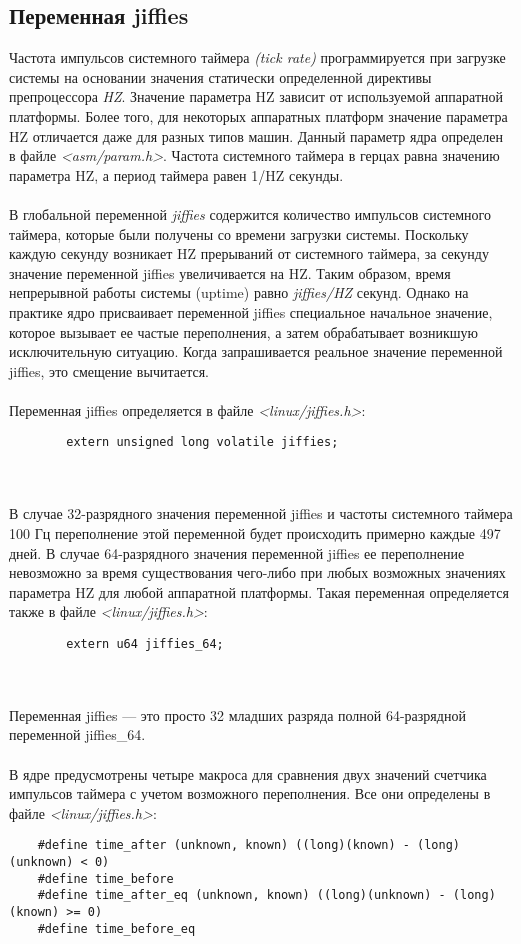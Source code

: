     \subsection{Переменная jiffies}
    Частота импульсов системного таймера \textit{(tick rate)} программируется при загрузке системы на основании значения статически определенной директивы препроцессора \textit{HZ}. Значение параметра HZ зависит от используемой аппаратной платформы. Более того, для некоторых аппаратных платформ значение параметра HZ отличается даже для разных типов машин. Данный параметр ядра определен в файле \textit{<asm/param.h>}. Частота системного таймера в герцах равна значению параметра HZ, а период таймера равен 1/HZ секунды.
    \\\\
    В глобальной переменной \textit{jiffies} содержится количество импульсов системного таймера, которые были получены со времени загрузки системы. Поскольку каждую секунду возникает HZ прерываний от системного таймера, за секунду значение переменной jiffies увеличивается на HZ. Таким образом, время непрерывной работы системы (uptime) равно \textit{jiffies/HZ} секунд. Однако на практике ядро присваивает переменной jiffies специальное начальное значение, которое вызывает ее частые переполнения, а затем обрабатывает возникшую исключительную ситуацию. Когда запрашивается реальное значение переменной jiffies, это смещение вычитается.
    \\\\
    Переменная jiffies определяется в файле \textit{<linux/jiffies.h>}:
    \begin{lstlisting}
        extern unsigned long volatile jiffies;
    \end{lstlisting}

    \\\\
    В случае 32-разрядного значения переменной jiffies и частоты системного таймера 100 Гц переполнение этой переменной будет происходить примерно каждые 497 дней. В случае 64-разрядного значения переменной jiffies ее переполнение невозможно за время существования чего-либо при любых возможных значениях параметра HZ для любой аппаратной платформы. Такая переменная определяется также в файле \textit{<linux/jiffies.h>}:
    \begin{lstlisting}
        extern u64 jiffies_64;
    \end{lstlisting}
    \\\\
    Переменная jiffies — это просто 32 младших разряда полной 64-разрядной переменной jiffies\_64.
    \\\\
    В ядре предусмотрены четыре макроса для сравнения двух значений счетчика импульсов таймера с учетом возможного переполнения. Все они определены в файле \textit{<linux/jiffies.h>}:
    \begin{lstlisting}
    #define time_after (unknown, known) ((long)(known) - (long)(unknown) < 0)
    #define time_before
    #define time_after_eq (unknown, known) ((long)(unknown) - (long)(known) >= 0)
    #define time_before_eq
    \end{lstlisting}
    
